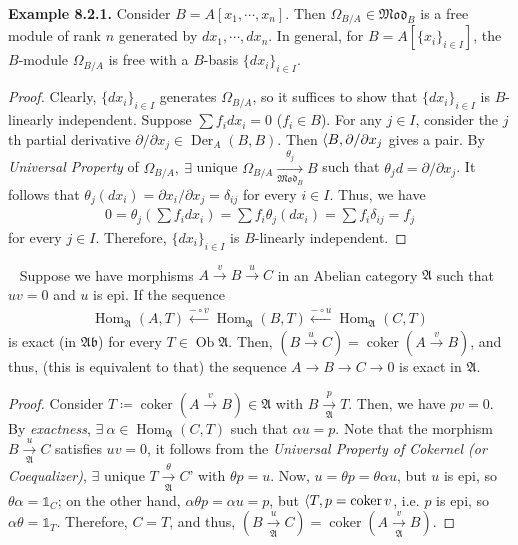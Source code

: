\documentclass[11pt,a4paper,footinclude=true,headinclude=true]{scrbook} %
\DeclareMathOperator{\Hom}{Hom}
\DeclareMathOperator{\Coker}{coker}
\DeclareMathOperator{\Der}{Der}
\DeclareMathOperator{\Ob}{Ob}
\newcommand{\Af}{\mathfrak{A}}
\newcommand{\Ab}{\mathfrak{Ab}}
\newcommand{\<}{\langle}
\let\>\relax
\newcommand{\>}{\rangle}
\newcommand{\MOD}{\mathfrak{Mod}}
\newenvironment{lemma}[2][]
{\renewcommand\theinnercustomlemma{#2}\innercustomlemma[#1]
\begin{mdframed}[backgroundcolor=gray!20]\ }
{\end{mdframed}\endinnercustomprop}
\newenvironment{example}[2][Example]
    { \begin{mdframed}[backgroundcolor=gray!20] \textbf{#1 #2.} }
    {  \end{mdframed}}
\begin{document}
\begin{example}{8.2.1}
    Consider $B=A[x_1,\cdots,x_n]$. Then $\Omega_{B/A}\in\MOD_B$ is a free module of rank $n$ generated by $dx_1,\cdots,dx_n$. In general, for $B=A[\{x_i\}_{i\in I}]$, the $B$-module $\Omega_{B/A}$ is free with a $B$-basis $\{dx_i\}_{i\in I}$.
\end{example}
\begin{proof}
    Clearly, $\{dx_i\}_{i\in I}$ generates $\Omega_{B/A}$, so it suffices to show that $\{dx_i\}_{i\in I}$ is $B$-linearly independent. Suppose $\sum f_idx_i=0$ ($f_i\in B$). For any $j\in I$, consider the $j$th partial derivative $\partial/\partial x_j\in\Der_A(B,B)$. Then $\<B,\partial/\partial x_j\>$ gives a pair. By \textit{Universal Property} of $\Omega_{B/A},\ \exists$ unique $\Omega_{B/A}\xrightarrow[\MOD_B]{\theta_j}B$ such that $\theta_jd=\partial/\partial x_j$. It follows that $\theta_j(dx_i)=\partial x_i/\partial x_j=\delta_{ij}$ for every $i\in I$. Thus, we have
    \begin{align*}
        0=\theta_j(\sum f_idx_i)=\sum f_i\theta_j(dx_i)=\sum f_i\delta_{ij}=f_j
    \end{align*}
    for every $j\in I$. Therefore, $\{dx_i\}_{i\in I}$ is $B$-linearly independent.
\end{proof}

\begin{lemma}{8.A (Categorical Fact)}\newline
    Suppose we have morphisms $A\xrightarrow{v}B\xrightarrow{u}C$ in an Abelian category $\Af$ such that $uv=0$ and $u$ is epi. If the sequence
    \begin{align*}
        \Hom_\Af(A,T)\xleftarrow{-\circ v}\Hom_\Af(B,T)\xleftarrow{-\circ u}\Hom_\Af(C,T)
    \end{align*}
    is exact (in $\Ab$) for every $T\in\Ob\Af$. Then, $(B\xrightarrow{u}C)=\Coker(A\xrightarrow{v}B)$, and thus, (this is equivalent to that) the sequence $A\to B\to C\to0$ is exact in $\Af$.
\end{lemma}
\begin{proof}
    Consider $T\coloneqq\Coker(A\xrightarrow{v}B)\in\Af$ with $B\xrightarrow[\Af]{p}T$. Then, we have $pv=0$. By \textit{exactness}, $\exists\ \alpha\in\Hom_\Af(C,T)$ such that $\alpha u=p$. Note that the morphism $B\xrightarrow[\Af]{u}C$ satisfies $uv=0$, it follows from the \textit{Universal Property of Cokernel (or Coequalizer)}, $\exists$ unique $T\xrightarrow[\Af]{\theta}C$' with $\theta p=u$. Now, $u=\theta p=\theta\alpha u$, but $u$ is epi, so $\theta\alpha=\mathds{1}_C$; on the other hand, $\alpha\theta p=\alpha u=p$, but $\<T,p\>=\Coker v$, i.e. $p$ is epi, so $\alpha\theta=\mathds{1}_T$. Therefore, $C=T$, and thus, $(B\xrightarrow[\Af]{u}C)=\Coker(A\xrightarrow[\Af]{v}B)$. 
\end{proof}
\end{document}
